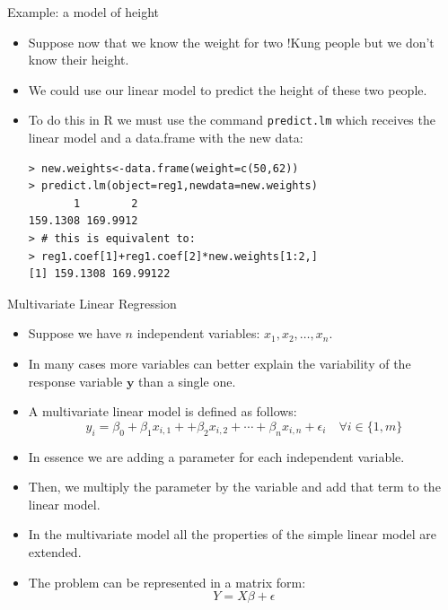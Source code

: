 \documentclass[handout]{beamer}
\begin{document}
\begin{frame}[fragile]{Example: a model of height}
\scriptsize{
\begin{itemize}
\item  Suppose now that we know the weight for two !Kung people but we don't know their height.

\item  We could use our linear model to predict the height of these two people.

\item To do this in R we must use the command \verb+predict.lm+ which receives the linear model and a data.frame with the new data:
\begin{verbatim}
> new.weights<-data.frame(weight=c(50,62))
> predict.lm(object=reg1,newdata=new.weights)
       1        2 
159.1308 169.9912 
> # this is equivalent to:
> reg1.coef[1]+reg1.coef[2]*new.weights[1:2,]
[1] 159.1308 169.99122
\end{verbatim}

 
 \end{itemize}
 

} 
\end{frame}


\begin{frame}{Multivariate Linear Regression}
\scriptsize{
\begin{itemize}
 \item Suppose we have $n$ independent variables:  $x_1,x_2,\dots,x_n$.
 \item In many cases more variables can better explain the variability of the response variable $\mathbf{y}$ than a single one.
 \item A multivariate linear model is defined as follows:
 \begin{displaymath}
 y_i=\beta_{0}+\beta_{1}x_{i,1}+ +\beta_{2}x_{i,2} + \cdots + \beta_{n}x_{i,n} +  \epsilon_i \quad \forall i \in \{1,m\}
\end{displaymath}

\item In essence we are adding a parameter for each independent variable.

\item Then, we multiply the parameter by the variable and add that term to the linear model.

\item  In the multivariate model all the properties of the simple linear model are extended.

\item The problem can be represented in a matrix form:
\begin{displaymath}
 Y=X\beta+\epsilon
\end{displaymath}








\end{itemize}
 

}
\end{frame}
\end{document}
